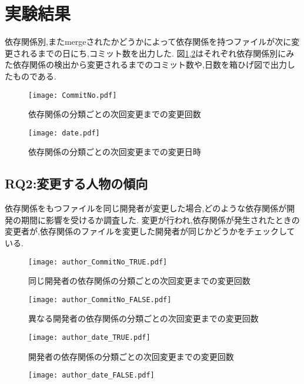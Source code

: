 \documentclass[submit,ses,noauthor]{ipsj} %
\begin{document}
\section{実験結果}\label{実験結果}
依存関係別,またmergeされたかどうかによって依存関係を持つファイルが次に変更されるまでの日にち,コミット数を出力した.
図\ref{fig:subNo},\ref{fig:subdate}はそれぞれ依存関係別にみた依存関係の検出から変更されるまでのコミット数や,日数を箱ひげ図で出力したものである.　　



\begin{figure}
\centering
\texttt{[image: CommitNo.pdf]}
\caption{依存関係の分類ごとの次回変更までの変更回数}
\label{fig:subNo} 
\end{figure}

\begin{figure}
\centering
\texttt{[image: date.pdf]}
\caption{依存関係の分類ごとの次回変更までの変更日時}
\label{fig:subdate} 
\end{figure}


\subsection{RQ2:変更する人物の傾向}
依存関係をもつファイルを同じ開発者が変更した場合,どのような依存関係が開発の期間に影響を受けるか調査した.
変更が行われ,依存関係が発生されたときの変更者が,依存関係のファイルを変更した開発者が同じかどうかをチェックしている.



\begin{figure}
\centering
\texttt{[image: author\_CommitNo\_TRUE.pdf]}
\caption{同じ開発者の依存関係の分類ごとの次回変更までの変更回数}
\label{fig:author_true_subNo} 
\end{figure}

\begin{figure}
\centering
\texttt{[image: author\_CommitNo\_FALSE.pdf]}
\caption{異なる開発者の依存関係の分類ごとの次回変更までの変更回数}
\label{fig:author_false_subNo} 
\end{figure}

\begin{figure}
\centering
\texttt{[image: author\_date\_TRUE.pdf]}
\caption{開発者の依存関係の分類ごとの次回変更までの変更回数}
\label{fig:author_true_subdate} 
\end{figure}

\begin{figure}
\centering
\texttt{[image: author\_date\_FALSE.pdf]}
\caption{}
\label{fig:author_false_subdate} 
\end{figure}
\end{document}
